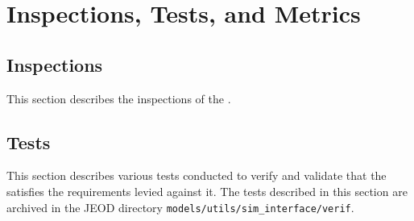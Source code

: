 %
% 

\chapter{Inspections, Tests, and Metrics}
\label{ch:ivv}

\section{Inspections}\label{sec:inspect}
This section describes the inspections of the \ModelDesc.



\newpage
\section{Tests}
This section describes various tests conducted to verify and validate
that the \ModelDesc satisfies the requirements levied against it. 
The tests described in this section
are archived in the JEOD directory \verb+models/utils/sim_interface/verif+.




\newpage
\boilerplatetraceability

\newpage
\boilerplatemetrics
%
